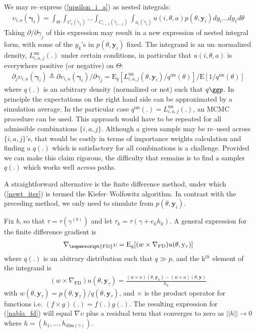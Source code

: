 \documentclass[11pt]{article}
\begin{document}
We may re--express (\ref{upsilon_i_a}) as nested integrals:
\begin{align}\label{upsilon_i_a_alt}
\upsilon_{i,a}(\boldsymbol{\gamma}_i)=\int_{\Theta}\int_{C_1(\tilde \gamma_1)}...\int_{C_{i-1}(\tilde \gamma_{i-1})}\int_{a_i(\tilde \gamma_i)}u(i,\theta,a)p(\theta,\mathbf{y}_i)dy_i...d y_1 d\theta
\end{align}Taking $\partial/\partial \gamma_j$ of this expression may result in a new expression of nested integral form, with some of the $y_k$'s in $p(\theta,\mathbf{y}_i)$ fixed. The integrand is an un--normalized density, $L_{i,a,j}^{\mathrm{un}}(.)$ under certain conditions, in particular that $u(i,\theta,a)$ is everywhere positive (or negative) on $\Theta$:
\begin{align}
\partial_j \upsilon_{i,a}(\boldsymbol{\gamma}_i)\triangleq \partial \upsilon_{i,a}(\boldsymbol{\gamma}_i)/\partial\gamma_j=\mathrm{E}_q[L_{i,a,j}^{\mathrm{un}}(\theta,\mathbf{y}_i)/q^{\mathrm{un}}(\theta)]/\mathrm{E}[1/q^{\mathrm{un}}(\theta)]
\end{align}where $q(.)$ is an arbitrary density (normalized or not) such that $q\ggp$. In principle the expectations on the right hand side can be approximated by a simulation average. In the particular case $q^{\mathrm{un}}(.)=L_{i,a,j}^{\mathrm{un}}(.)$, an MCMC procedure can be used. This approach would have to be repeated for all admissible combinations $\{i,a,j\}$. Although a given sample may be re--used across $\{i,a,j\}$'s, that would be costly in terms of importance weights calculation and finding a $q(.)$ which is satisfactory for all combinations is a challenge. Provided we can make this claim rigorous, the difficulty that remains is to find a sampler $q(.)$ which works well \emph{across} paths. 



A straightforward alternative is the finite difference method, under which (\ref{newt_iter}) is termed the Kiefer--Wolfowitz algorithm. In contrast with the preceding method, we only need to simulate from $p(\theta,\mathbf{y}_i)$.

Fix $b$, so that $\tau=\tau(\gamma^{(b)})$ and let $\tau_k=\tau(\gamma+e_k h_k)$. A general expression for the finite difference gradient is 
\begin{align}\label{nabla_fd}
\nabla_{\superscript{\mathrm{FD}}}\upsilon=\mathrm{E}_q[(w\times \nabla_{\mathrm{FD}})u(\theta,\mathrm{y}_\tau)]
\end{align}where $q(.)$ is an abitrary distribution such that $q\gg p$, and the k$^{th}$ element of the integrand is
\begin{align}\label{nabla_u_is}
(w\times \nabla_{\mathrm{FD}})u(\theta,\mathbf{y}_{\tau})=\frac{(w\times u)(\theta,\mathbf{y}_k)-(w\times u)(\theta,\mathbf{y})}{h_k}
\end{align}with $w(\theta,\mathbf{y}_{\tau})=p(\theta,\mathbf{y}_{\tau})/q(\theta,\mathbf{y}_{\tau})$, and $\times$ is the product operator for functions i.e. $(f\times g)(.)=f(.)g(.)$. The resulting expression for (\ref{nabla_fd}) will equal $\nabla \upsilon$ plus a residual term that converges to zero as $||h||\rightarrow 0$ where $h=(h_1,...,h_{\mathrm{dim}(\gamma)})$.
\end{document}

